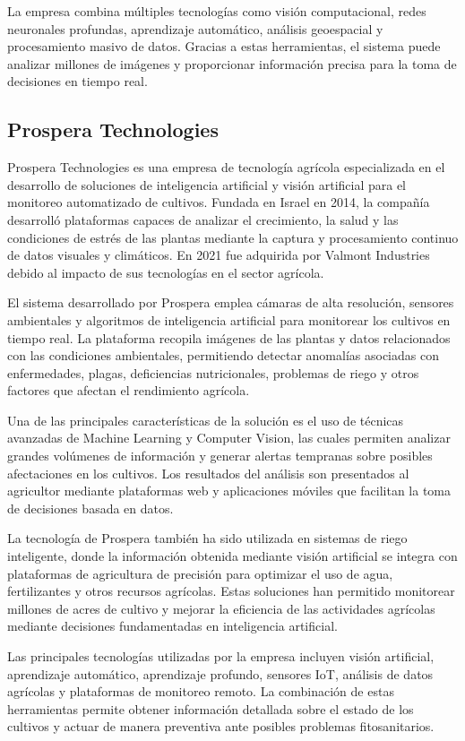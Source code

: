 La empresa combina múltiples tecnologías como visión computacional, redes neuronales profundas, aprendizaje automático, análisis geoespacial y procesamiento masivo de datos. Gracias a estas herramientas, el sistema puede analizar millones de imágenes y proporcionar información precisa para la toma de decisiones en tiempo real.


\subsection{Prospera Technologies}

Prospera Technologies es una empresa de tecnología agrícola especializada en el desarrollo de soluciones de inteligencia artificial y visión artificial para el monitoreo automatizado de cultivos. Fundada en Israel en 2014, la compañía desarrolló plataformas capaces de analizar el crecimiento, la salud y las condiciones de estrés de las plantas mediante la captura y procesamiento continuo de datos visuales y climáticos. En 2021 fue adquirida por Valmont Industries debido al impacto de sus tecnologías en el sector agrícola.

El sistema desarrollado por Prospera emplea cámaras de alta resolución, sensores ambientales y algoritmos de inteligencia artificial para monitorear los cultivos en tiempo real. La plataforma recopila imágenes de las plantas y datos relacionados con las condiciones ambientales, permitiendo detectar anomalías asociadas con enfermedades, plagas, deficiencias nutricionales, problemas de riego y otros factores que afectan el rendimiento agrícola.

Una de las principales características de la solución es el uso de técnicas avanzadas de Machine Learning y Computer Vision, las cuales permiten analizar grandes volúmenes de información y generar alertas tempranas sobre posibles afectaciones en los cultivos. Los resultados del análisis son presentados al agricultor mediante plataformas web y aplicaciones móviles que facilitan la toma de decisiones basada en datos.

La tecnología de Prospera también ha sido utilizada en sistemas de riego inteligente, donde la información obtenida mediante visión artificial se integra con plataformas de agricultura de precisión para optimizar el uso de agua, fertilizantes y otros recursos agrícolas. Estas soluciones han permitido monitorear millones de acres de cultivo y mejorar la eficiencia de las actividades agrícolas mediante decisiones fundamentadas en inteligencia artificial.

Las principales tecnologías utilizadas por la empresa incluyen visión artificial, aprendizaje automático, aprendizaje profundo, sensores IoT, análisis de datos agrícolas y plataformas de monitoreo remoto. La combinación de estas herramientas permite obtener información detallada sobre el estado de los cultivos y actuar de manera preventiva ante posibles problemas fitosanitarios.
